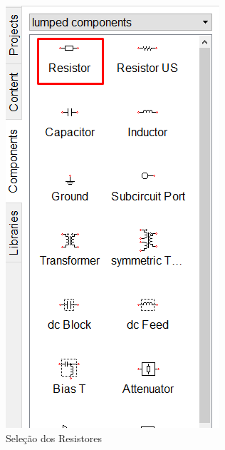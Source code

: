 \begin{figure}[H]
   
    \begin{subfigure}{.4\textwidth}
        \centering
        \includegraphics[width=.7\textwidth, trim={0 9cm 0 0}, clip]{imagens/CircuitoA/resistor.png}
        \caption{Seleção dos Resistores}
        \label{fig:sel_resis}
    \end{subfigure}
    \begin{subfigure}{.4\textwidth}
        \centering

\end{subfigure}
\end{figure}
